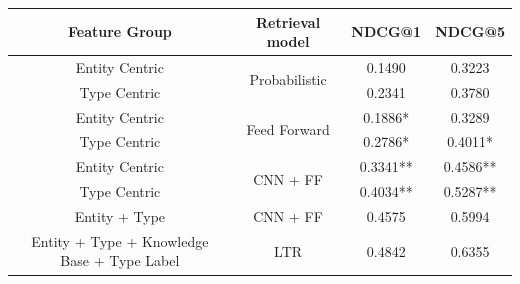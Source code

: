 \begin{table}[]
	\begin{tabular}{c|c|c|c}

		Feature Group                               & Retrieval model                & NDCG@1   & NDCG@5   \\ \hline
		Entity Centric                              & \multirow{2}{*}{Probabilistic} & 0.1490   & 0.3223   \\ 
		Type Centric                                &                                & 0.2341   & 0.3780   \\ \hline
		Entity Centric                              & \multirow{2}{*}{Feed Forward}  & 0.1886*  & 0.3289   \\ 
		Type Centric                                &                                & 0.2786*  & 0.4011*  \\ \hline
		Entity Centric                              & \multirow{2}{*}{CNN + FF}      & 0.3341** & 0.4586** \\ 
		Type Centric                                &                                & 0.4034** & 0.5287** \\ \hline
		Entity + Type                               & CNN + FF                       & 0.4575   & 0.5994   \\ \hline
		Entity + Type + Knowledge Base + Type Label & LTR                            & 0.4842   & 0.6355   \\ \hline
	\end{tabular}
\end{table}

